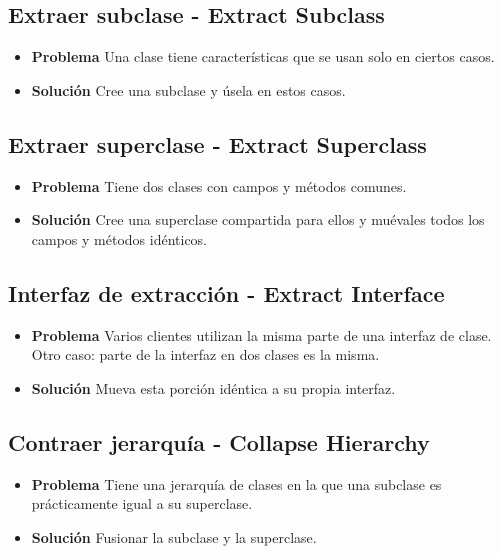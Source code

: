 \documentclass[11pt,a4paper,oneside]{book}
\begin{document}
\subsection{Extraer subclase - Extract Subclass}
\label{extractsubclass}
\begin{itemize}
    \item \textbf{Problema} Una clase tiene características que se usan solo en ciertos casos.
    \item \textbf{Solución} Cree una subclase y úsela en estos casos.
\end{itemize}

\subsection{Extraer superclase - Extract Superclass}
\label{extractsuperclass}
\begin{itemize}
    \item \textbf{Problema} Tiene dos clases con campos y métodos comunes.
    \item \textbf{Solución} Cree una superclase compartida para ellos y muévales todos los campos y métodos idénticos.
\end{itemize}

\subsection{Interfaz de extracción - Extract Interface}
\label{extractinterface}
\begin{itemize}
    \item \textbf{Problema} Varios clientes utilizan la misma parte de una interfaz de clase. Otro caso: parte de la interfaz en dos clases es la misma.
    \item \textbf{Solución} Mueva esta porción idéntica a su propia interfaz.
\end{itemize}

\subsection{Contraer jerarquía - Collapse Hierarchy}
\label{colapsehierarchy}
\begin{itemize}
    \item \textbf{Problema} Tiene una jerarquía de clases en la que una subclase es prácticamente igual a su superclase.
    \item \textbf{Solución} Fusionar la subclase y la superclase.
\end{itemize}
\end{document}
